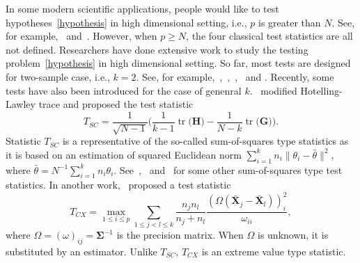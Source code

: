 \documentclass[12pt]{article} %
\DeclareMathOperator{\mytr}{tr}
\newcommand{\bX}{\mathbf{X}}
\newcommand{\bH}{\mathbf{H}}
\newcommand{\bG}{\mathbf{G}}
\newcommand{\bfsym}[1]{\ensuremath{\boldsymbol{#1}}}
\def\bSigma {\bfsym {\Sigma}}
\theoremstyle{definition}
\begin{document}
In some modern scientific applications, people would like to test hypotheses~\eqref{hypothesis} in high dimensional setting, i.e., $p$ is greater than $N$.
See, for example,~\citet{Verstynen1209} and~\citet{Tsai2009}.
However, when $p\geq N$, the four classical test statistics are all not defined.
  Researchers have done extensive work to study the testing problem~\eqref{hypothesis} in high dimensional setting.
 So far, most tests are designed for two-sample case, i.e., $k=2$.
  See, for example,~\citet{Bai1996Efiect},~\cite{Srivastava2007Multivariate},~\citet{Chen2010A},~\citet{Tony2013} and \citet{Feng2014Two}.
  Recently, some tests have also been introduced for the case of genenral $k$.~\cite{Schott2007Some} modified Hotelling-Lawley trace and proposed the test statistic
  $$
  T_{SC}=\frac{1}{\sqrt{N-1}}\Big(
  \frac{1}{k-1}\mytr\big(\bH\big)-\frac{1}{N-k}\mytr\big(\bG\big)
  \Big).
  $$
Statistic $T_{SC}$ is a representative of the so-called sum-of-squares type statistics as it is based on an estimation of squared Euclidean norm $\sum_{i=1}^k n_i\|\theta_i-\bar{\theta}\|^2$, where $\bar{\theta}=N^{-1}\sum_{i=1}^k n_i \theta_i$.
See~\cite{Srivastava2013},~\cite{Yamada2015} and~\cite{Chang2017} for some other sum-of-squares type test statistics.
In another work,~\cite{Cai2014High} proposed a test statistic 
  $$
  T_{CX}=\max_{1\leq i\leq p} \sum_{1\leq j<l\leq k}\frac{n_j n_l}{n_j+n_l}\frac{(\Omega(\bar{\bX}_j-\bar{\bX}_l))_i^2}{\omega_{ii}},
  $$
  where $\Omega=(\omega)_{ij}=\bSigma^{-1}$ is the precision matrix. When $\Omega$ is unknown, it is substituted by an estimator.
  Unlike $T_{SC}$, $T_{CX}$ is an extreme value type statistic.
  
\end{document}
